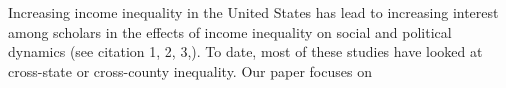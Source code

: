 Increasing income inequality in the United States has lead to increasing interest among scholars in the effects of income inequality on social and political dynamics (see citation 1, 2, 3,). To date, most of these studies have looked at cross-state or cross-county inequality. Our paper focuses on 
